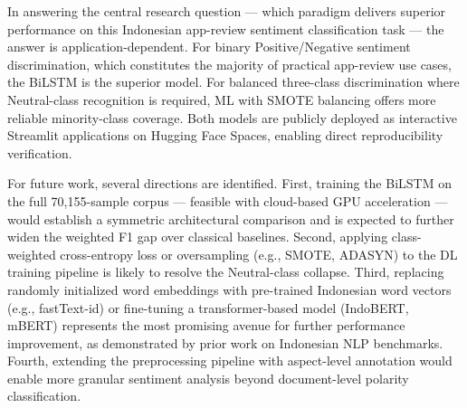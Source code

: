 \documentclass{article}
\begin{document}
In answering the central research question --- which paradigm delivers superior performance on this Indonesian app-review sentiment classification task --- the answer is application-dependent. For binary Positive/Negative sentiment discrimination, which constitutes the majority of practical app-review use cases, the BiLSTM is the superior model. For balanced three-class discrimination where Neutral-class recognition is required, ML with SMOTE balancing offers more reliable minority-class coverage. Both models are publicly deployed as interactive Streamlit applications on Hugging Face Spaces, enabling direct reproducibility verification.

For future work, several directions are identified. First, training the BiLSTM on the full 70,155-sample corpus --- feasible with cloud-based GPU acceleration --- would establish a symmetric architectural comparison and is expected to further widen the weighted F1 gap over classical baselines. Second, applying class-weighted cross-entropy loss or oversampling (e.g., SMOTE, ADASYN) to the DL training pipeline is likely to resolve the Neutral-class collapse. Third, replacing randomly initialized word embeddings with pre-trained Indonesian word vectors (e.g., fastText-id) or fine-tuning a transformer-based model (IndoBERT, mBERT) represents the most promising avenue for further performance improvement, as demonstrated by prior work on Indonesian NLP benchmarks. Fourth, extending the preprocessing pipeline with aspect-level annotation would enable more granular sentiment analysis beyond document-level polarity classification.

\end{document}
